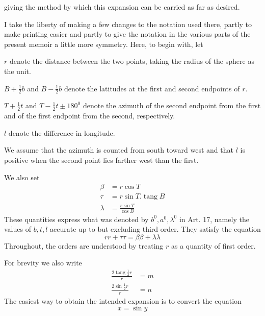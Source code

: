 %
giving the method by which this expansion can be carried as far as desired.

I take the liberty of making a few changes to the notation used there, partly to make printing easier and partly to give the notation in the various parts of the present memoir a little more symmetry. Here, to begin with, let
\begin{list}{}{\setlength{\leftmargin}{1.4em}\setlength{\itemindent}{-1.4em}\setlength{\itemsep}{0pt}\setlength{\parsep}{0pt}}
\item \(r\) denote the distance between the two points, taking the radius of the sphere as the unit.
\item \(B+\frac12b\) and \(B-\frac12b\) denote the latitudes at the first and second endpoints of \(r\).
\item \(T+\frac12t\) and \(T-\frac12t\pm180^0\) denote the azimuth of the second endpoint from the first and of the first endpoint from the second, respectively.
\item \(l\) denote the difference in longitude.
\end{list}
\noindent We assume that the azimuth is counted from south toward west and that \(l\) is positive when the second point lies farther west than the first.

We also set
\[
\begin{aligned}
\beta&=r\cos T\\
\tau&=r\sin T\mathord{.}\operatorname{tang}B\\
\lambda&=\frac{r\sin T}{\cos B}
\end{aligned}
\]
These quantities express what was denoted by \(b^0,a^0,\lambda^0\) in Art. 17, namely the values of \(b,t,l\) accurate up to but excluding third order. They satisfy the equation
\[
rr+\tau\tau=\beta\beta+\lambda\lambda
\]
Throughout, the orders are understood by treating \(r\) as a quantity of first order.

\indent For brevity we also write
\[
\begin{aligned}
\frac{2\operatorname{tang}\frac12r}{r}&=m\\
\frac{2\sin\frac12r}{r}&=n
\end{aligned}
\]
The easiest way to obtain the intended expansion is to convert the equation
\[
x=\sin y
\]
